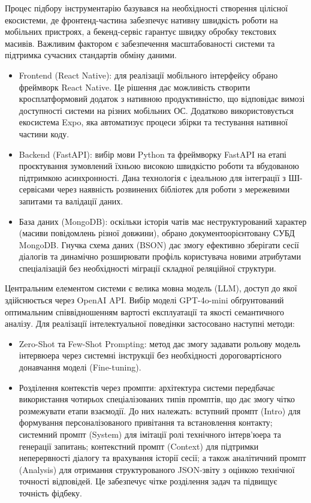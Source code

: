 Процес підбору інструментарію базувався на необхідності створення
цілісної екосистеми, де фронтенд-частина забезпечує нативну швидкість
роботи на мобільних пристроях, а бекенд-сервіс гарантує швидку обробку
текстових масивів. Важливим фактором є забезпечення масштабованості
системи та підтримка сучасних стандартів обміну даними.

\begin{itemize}
\item
  Frontend (React Native): для реалізації мобільного інтерфейсу обрано
  фреймворк React Native. Це рішення дає можливість створити
  кросплатформовий додаток з нативною продуктивністю, що відповідає
  вимозі доступності системи на різних мобільних ОС. Додатково
  використовується екосистема Expo, яка автоматизує процеси збірки та
  тестування нативної частини коду.
\item
  Backend (FastAPI): вибір мови Python та фреймворку FastAPI на етапі
  проєктування зумовлений їхньою високою швидкістю роботи та вбудованою
  підтримкою асинхронності. Дана технологія є ідеальною для інтеграції з
  ШІ-сервісами через наявність розвинених бібліотек для роботи з
  мережевими запитами та валідації даних.
\item
  База даних (MongoDB): оскільки історія чатів має неструктурований
  характер (масиви повідомлень різної довжини), обрано
  документоорієнтовану СУБД MongoDB. Гнучка схема даних (BSON) дає змогу
  ефективно зберігати сесії діалогів та динамічно розширювати профіль
  користувача новими атрибутами спеціалізацій без необхідності міграції
  складної реляційної структури.
\end{itemize}

Центральним елементом системи є велика мовна модель (LLM), доступ до
якої здійснюється через OpenAI API. Вибір моделі GPT-4o-mini
обґрунтований оптимальним співвідношенням вартості експлуатації та
якості семантичного аналізу. Для реалізації інтелектуальної поведінки
застосовано наступні методи:

\begin{itemize}
\item
  Zero-Shot та Few-Shot Prompting: метод дає змогу задавати рольову
  модель інтерв\textquotesingle юера через системні інструкції без
  необхідності дороговартісного донавчання моделі (Fine-tuning).
\item
  Розділення контекстів через промпти: архітектура системи передбачає
  використання чотирьох спеціалізованих типів промптів, що дає змогу
  чітко розмежувати етапи взаємодії. До них належать: вступний промпт
  (Intro) для формування персоналізованого привітання та встановлення
  контакту; системний промпт (System) для імітації ролі технічного
  інтерв'юера та генерації запитань; контекстний промпт (Context) для
  підтримки неперервності діалогу та врахування історії сесії; а також
  аналітичний промпт (Analysis) для отримання структурованого JSON-звіту
  з оцінкою технічної точності відповідей. Це забезпечує чітке
  розділення задач та підвищує точність фідбеку.
\end{itemize}


